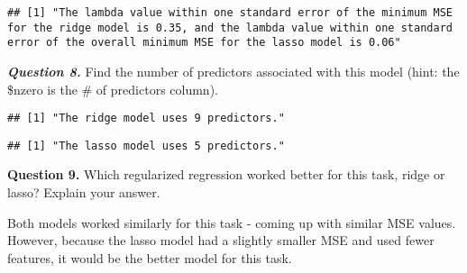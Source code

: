 \documentclass[
]{article}
\newenvironment{Shaded}{\begin{snugshade}}{\end{snugshade}}
\newcommand{\CommentTok}[1]{\textcolor[rgb]{0.56,0.35,0.01}{\textit{#1}}}
\newcommand{\FloatTok}[1]{\textcolor[rgb]{0.00,0.00,0.81}{#1}}
\newcommand{\FunctionTok}[1]{\textcolor[rgb]{0.00,0.00,0.00}{#1}}
\newcommand{\NormalTok}[1]{#1}
\newcommand{\SpecialCharTok}[1]{\textcolor[rgb]{0.00,0.00,0.00}{#1}}
\newcommand{\StringTok}[1]{\textcolor[rgb]{0.31,0.60,0.02}{#1}}
\begin{document}
\begin{verbatim}
## [1] "The lambda value within one standard error of the minimum MSE for the ridge model is 0.35, and the lambda value within one standard error of the overall minimum MSE for the lasso model is 0.06"
\end{verbatim}

\textbf{\emph{Question 8.}} Find the number of predictors associated
with this model (hint: the \$nzero is the \# of predictors column).

\begin{Shaded}
\end{Shaded}

\begin{verbatim}
## [1] "The ridge model uses 9 predictors."
\end{verbatim}

\begin{Shaded}
\end{Shaded}

\begin{verbatim}
## [1] "The lasso model uses 5 predictors."
\end{verbatim}

\textbf{Question 9.} Which regularized regression worked better for this
task, ridge or lasso? Explain your answer.

Both models worked similarly for this task - coming up with similar MSE
values. However, because the lasso model had a slightly smaller MSE and
used fewer features, it would be the better model for this task.
\end{document}
